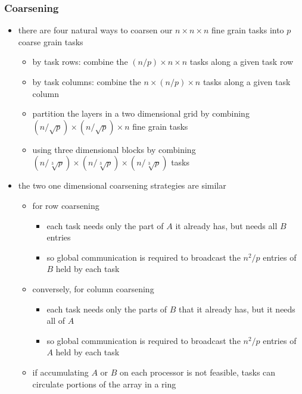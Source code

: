 \begin{frame}[fragile]
%
  \frametitle{Coarsening}
%
  \begin{itemize}
%
  \item there are four natural ways to coarsen our $n \times n \times n$ fine grain tasks into
    $p$ coarse grain tasks
    \begin{itemize}
    \item by task rows: combine the $(n/p) \times n \times n$ tasks along a given task row
    \item by task columns: combine the $n \times (n/p) \times n$ tasks along a given task
      column
    \item partition the layers in a two dimensional grid by combining $(n/\sqrt{p}) \times
      (n/\sqrt{p}) \times n$ fine grain tasks
    \item using three dimensional blocks by combining $(n/\sqrt[3]{p}) \times (n/\sqrt[3]{p})
      \times (n/\sqrt[3]{p})$ tasks
    \end{itemize}
%
    \item the two one dimensional coarsening strategies are similar
      \begin{itemize}
      \item for row coarsening
        \begin{itemize}
        \item each task needs only the part of $A$ it already has, but needs all $B$ entries
        \item so global communication is required to broadcast the $n^{2}/p$ entries of $B$ held
          by each task
        \end{itemize}
      \item conversely, for column coarsening
        \begin{itemize}
        \item each task needs only the parts of $B$ that it already has, but it needs all of $A$
        \item so global communication is required to broadcast the $n^{2}/p$ entries of $A$ held
          by each task
        \end{itemize}
      \item if accumulating $A$ or $B$ on each processor is not feasible, tasks can circulate
        portions of the array in a ring
%
      \end{itemize}
%
  \end{itemize}
%
\end{frame}

